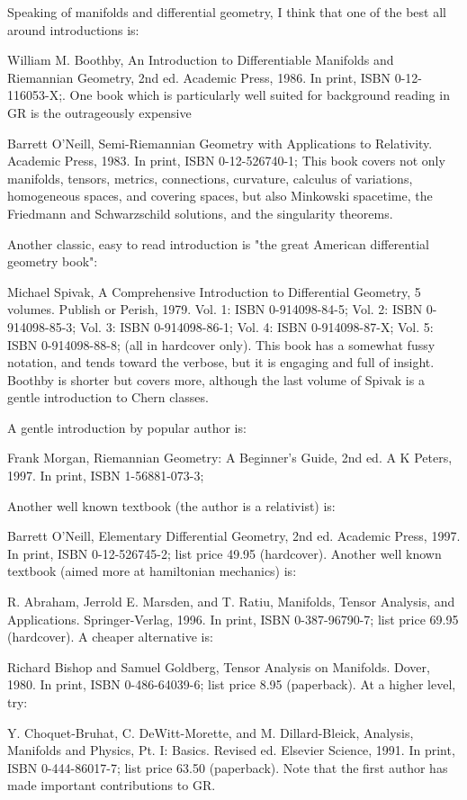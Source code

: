 \documentclass[10pt,a4paper]{book}
\theoremstyle{definition}
\begin{document}
Speaking of manifolds and differential geometry, I think that one of the best all around introductions is:

William M. Boothby,
An Introduction to Differentiable Manifolds and Riemannian Geometry, 2nd ed.
Academic Press, 1986.
In print, ISBN 0-12-116053-X;.
One book which is particularly well suited for background reading in GR is the outrageously expensive

Barrett O'Neill,
Semi-Riemannian Geometry with Applications to Relativity.
Academic Press, 1983.
In print, ISBN 0-12-526740-1; 
This book covers not only manifolds, tensors, metrics, connections, curvature, calculus of variations, homogeneous spaces, and covering spaces, but also Minkowski spacetime, the Friedmann and Schwarzschild solutions, and the singularity theorems.

Another classic, easy to read introduction is "the great American differential geometry book":

Michael Spivak,
A Comprehensive Introduction to Differential Geometry, 5 volumes.
Publish or Perish, 1979.
Vol. 1: ISBN 0-914098-84-5; 
Vol. 2: ISBN 0-914098-85-3;
Vol. 3: ISBN 0-914098-86-1;
Vol. 4: ISBN 0-914098-87-X;
Vol. 5: ISBN 0-914098-88-8; (all in hardcover only).
This book has a somewhat fussy notation, and tends toward the verbose, but it is engaging and full of insight.  Boothby is shorter but covers more, although the last volume of Spivak is a gentle introduction to Chern classes.

A gentle introduction by popular author is:

Frank Morgan,
Riemannian Geometry: A Beginner's Guide, 2nd ed.
A K Peters, 1997.
In print, ISBN 1-56881-073-3; 

Another well known textbook (the author is a relativist) is:

Barrett O'Neill,
Elementary Differential Geometry, 2nd ed.
Academic Press, 1997.
In print, ISBN 0-12-526745-2; list price 49.95 (hardcover).
Another well known textbook (aimed more at hamiltonian mechanics) is:

R. Abraham, Jerrold E. Marsden, and T. Ratiu,
Manifolds, Tensor Analysis, and Applications.
Springer-Verlag, 1996.
In print, ISBN 0-387-96790-7; list price 69.95 (hardcover).
A cheaper alternative is:

Richard Bishop and Samuel Goldberg,
Tensor Analysis on Manifolds.
Dover, 1980.
In print, ISBN 0-486-64039-6; list price 8.95 (paperback).
At a higher level, try:

Y. Choquet-Bruhat, C. DeWitt-Morette, and M. Dillard-Bleick,
Analysis, Manifolds and Physics, Pt. I: Basics.  Revised ed.
Elsevier Science, 1991.
In print, ISBN 0-444-86017-7; list price 63.50 (paperback).
Note that the first author has made important contributions to GR.
\end{document}
